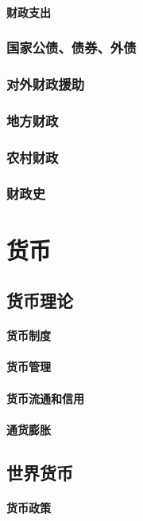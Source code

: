 \documentclass[UTF8]{../../RepresentationUniverse}
\begin{document}
        \subsubsection{财政支出}
    \subsection{国家公债、债券、外债}
    \subsection{对外财政援助}
    \subsection{地方财政}
    \subsection{农村财政}
    \subsection{财政史}
 





\chapter{货币}
\section{货币理论}
    \subsubsection{货币制度}
    \subsubsection{货币管理}
    \subsubsection{货币流通和信用}
    \subsubsection{通货膨胀}
\section{世界货币}
    \subsubsection{货币政策}
\end{document}
